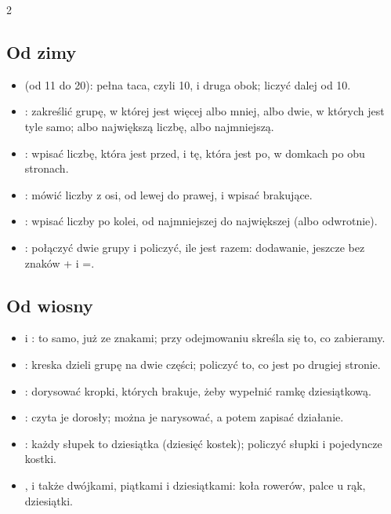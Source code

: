 {\begin{multicols}{2}
\subsection*{Od zimy}
\begin{itemize}[leftmargin=5mm, itemsep=1pt, topsep=0pt]
\item \textbf{\lblDecena} (od 11 do 20): pełna taca, czyli 10, i druga
  obok; liczyć dalej od 10.
\item \textbf{\lblCompara}: zakreślić grupę, w której jest więcej albo
  mniej, albo dwie, w których jest tyle samo; albo największą liczbę,
  albo najmniejszą.
\item \textbf{\lblVecinos}: wpisać liczbę, która jest przed, i tę, która
  jest po, w domkach po obu stronach.
\item \textbf{\lblRecta}: mówić liczby z osi, od lewej do prawej, i
  wpisać brakujące.
\item \textbf{\lblOrdena}: wpisać liczby po kolei, od najmniejszej do
  największej (albo odwrotnie).
\item \textbf{\lblJunta}: połączyć dwie grupy i policzyć, ile jest
  razem: dodawanie, jeszcze bez znaków + i =.
\end{itemize}

\subsection*{Od wiosny}
\begin{itemize}[leftmargin=5mm, itemsep=1pt, topsep=0pt]
\item \textbf{\lblSuma} i \textbf{\lblResta}: to samo, już ze znakami;
  przy odejmowaniu skreśla się to, co zabieramy.
\item \textbf{\lblParte}: kreska dzieli grupę na dwie części; policzyć
  to, co jest po drugiej stronie.
\item \textbf{\lblDiez}: dorysować kropki, których brakuje, żeby
  wypełnić ramkę dziesiątkową.
\item \textbf{\lblProblema}: czyta je dorosły; można je narysować, a
  potem zapisać działanie.
\item \textbf{\lblBloques}: każdy słupek to dziesiątka (dziesięć
  kostek); policzyć słupki i pojedyncze kostki.
\item \textbf{\lblCompleta}, \textbf{\lblRecta} i \textbf{\lblCuenta}
  także dwójkami, piątkami i dziesiątkami: koła rowerów, palce u rąk,
  dziesiątki.
\end{itemize}


\end{multicols}}
